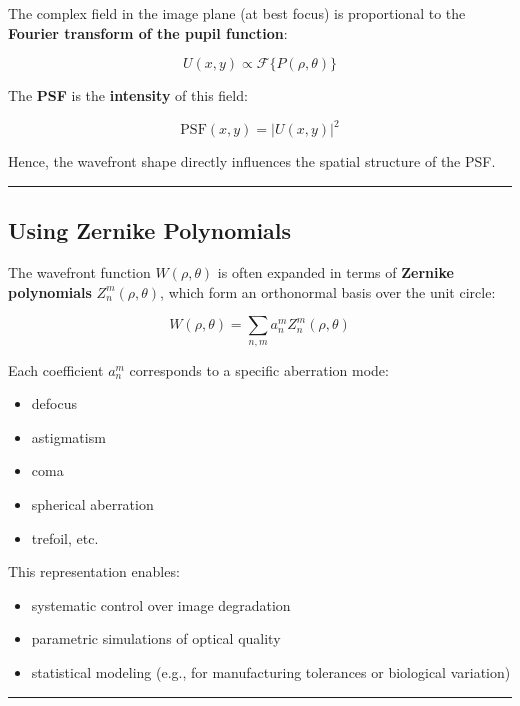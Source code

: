 \documentclass[
  letterpaper,
]{book}
\providecommand{\tightlist}{%
  \setlength{\itemsep}{0pt}\setlength{\parskip}{0pt}}\usepackage{longtable,booktabs,array}
\begin{document}
The complex field in the image plane (at best focus) is proportional to
the \textbf{Fourier transform of the pupil function}:

\[
U(x, y) \propto \mathcal{F}\{ P(\rho, \theta) \}
\]

The \textbf{PSF} is the \textbf{intensity} of this field:

\[
\text{PSF}(x, y) = |U(x, y)|^2
\]

Hence, the wavefront shape directly influences the spatial structure of
the PSF.

\begin{center}\rule{0.5\linewidth}{0.5pt}\end{center}

\subsection{Using Zernike Polynomials}\label{using-zernike-polynomials}

The wavefront function \(W(\rho, \theta)\) is often expanded in terms of
\textbf{Zernike polynomials} \(Z_n^m(\rho, \theta)\), which form an
orthonormal basis over the unit circle:

\[
W(\rho, \theta) = \sum_{n,m} a_n^m Z_n^m(\rho, \theta)
\]

Each coefficient \(a_n^m\) corresponds to a specific aberration mode:

\begin{itemize}
\tightlist
\item
  defocus
\item
  astigmatism
\item
  coma
\item
  spherical aberration
\item
  trefoil, etc.
\end{itemize}

This representation enables:

\begin{itemize}
\tightlist
\item
  systematic control over image degradation
\item
  parametric simulations of optical quality
\item
  statistical modeling (e.g., for manufacturing tolerances or biological
  variation)
\end{itemize}

\begin{center}\rule{0.5\linewidth}{0.5pt}\end{center}
\end{document}
